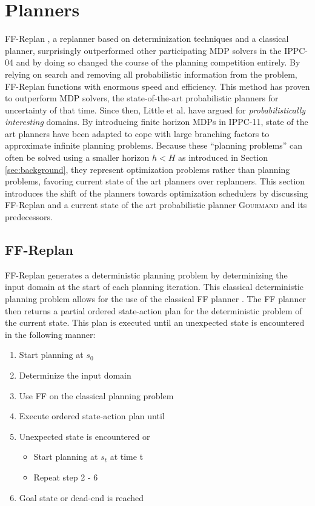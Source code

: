 \documentclass[runningheads,a4paper]{llncs}
\begin{document}

\section{Planners}
\label{sec:planners}

FF-Replan \cite{FFReplan}, a replanner based on determinization techniques and a classical planner, surprisingly outperformed other participating MDP solvers in the IPPC-04 and by doing so changed the course of the planning competition entirely. By relying on search and removing all probabilistic information from the problem, FF-Replan functions with enormous speed and efficiency. This method has proven to outperform MDP solvers, the state-of-the-art probabilistic planners for uncertainty of that time. Since then, Little et al. have argued for \emph{probabilistically interesting} domains. By introducing finite horizon MDPs in IPPC-11, state of the art planners have been adapted to cope with large branching factors to approximate infinite planning problems. Because these ``planning problems'' can often be solved using a smaller horizon $h < H$ as introduced in Section \ref{sec:background}, they represent optimization problems rather than planning problems, favoring current state of the art planners over replanners. This section introduces the shift of the planners towards optimization schedulers by discussing FF-Replan and a current state of the art probabilistic planner \textsc{Gourmand} and its predecessors.

\subsection{FF-Replan}
\label{sec:ffreplan}
FF-Replan generates a deterministic planning problem by determinizing the input domain at the start of each planning iteration. This classical deterministic planning problem allows for the use of the classical FF planner \cite{Hoffmann01theff}. The FF planner then returns a partial ordered state-action plan for the deterministic problem of the current state. This plan is executed until an unexpected state is encountered in the following manner:

\begin{enumerate}
	\item Start planning at $s_0$
	\item Determinize the input domain
	\item Use FF on the classical planning problem
	\item Execute ordered state-action plan until
	\item Unexpected state is encountered or
	\begin{itemize}
		\item Start planning at $s_t$ at time t
		\item Repeat step 2 - 6
	\end{itemize}
	\item Goal state or dead-end is reached
\end{enumerate}
\end{document}
